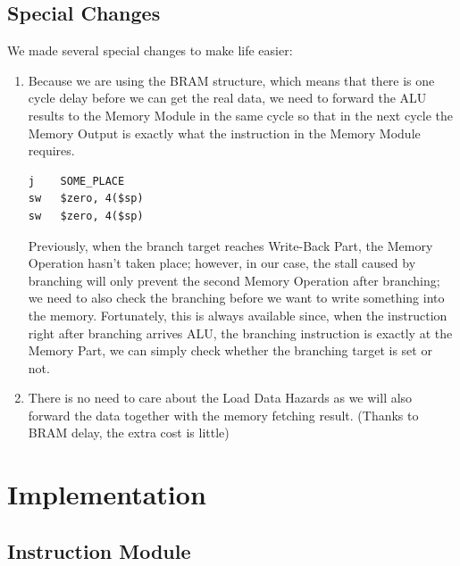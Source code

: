 \documentclass[a4paper,12pt, oneside]{book}
\begin{document}
\subsection{Special Changes}
We made several special changes to make life easier: 
\begin{enumerate}
	\item Because we are using the BRAM structure, which means that there is one cycle delay before we can get the real data, we need to forward the ALU results to the Memory Module in the same cycle so that in the next cycle the Memory Output is exactly what the instruction in the Memory Module requires.
	\begin{verbatim}
j    SOME_PLACE
sw   $zero, 4($sp)
sw   $zero, 4($sp)
	\end{verbatim}
	Previously, when the branch target reaches Write-Back Part, the Memory Operation hasn't taken place; however, in our case, the stall caused by branching will only prevent the second Memory Operation after branching; we need to also check the branching before we want to write something into the memory. Fortunately, this is always available since, when the instruction right after branching arrives ALU, the branching instruction is exactly at the Memory Part, we can simply check whether the branching target is set or not.
	\item There is no need to care about the Load Data Hazards as we will also forward the data together with the memory fetching result. (Thanks to BRAM delay, the extra cost is little)
\end{enumerate}
\section{Implementation}
\subsection{Instruction Module}
\end{document}
